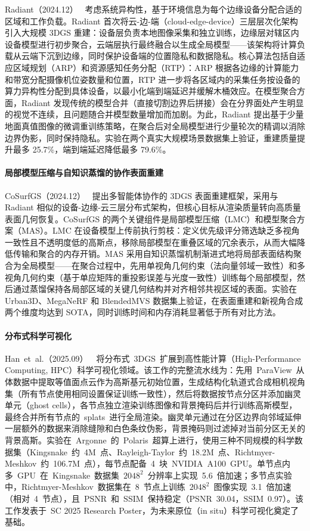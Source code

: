Radiant（2024.12）~\cite{2412_05546} 考虑系统异构性，基于环境信息为每个边缘设备分配合适的区域和工作负载。Radiant 首次将云-边-端（cloud-edge-device）三层层次化架构引入大规模 3DGS 重建：设备层负责本地图像采集和独立训练，边缘层对辖区内设备模型进行初步聚合，云端层执行最终融合以生成全局模型——该架构将计算负载从云端下沉到边缘，同时保护设备端的位置隐私和数据隐私。核心算法包括自适应区域规划（ARP）和资源感知任务分配（RTP）：ARP 根据各边缘的计算能力和带宽分配摄像机位姿数量和位置，RTP 进一步将各区域内的采集任务按设备的算力异构性分配到具体设备，以最小化端到端延迟并缓解木桶效应。在模型聚合方面，Radiant 发现传统的模型合并（直接切割边界后拼接）会在分界面处产生明显的视觉不连续，且问题随合并模型数量增加而加剧。为此，Radiant 提出基于少量地面真值图像的微调重训练策略，在聚合后对全局模型进行少量轮次的精调以消除边界伪影，同时保持隐私。实验在两个真实大规模场景数据集上验证，重建质量提升最多 25.7\%，端到端延迟降低最多 79.6\%。

\paragraph{局部模型压缩与自知识蒸馏的协作表面重建}

CoSurfGS（2024.12）~\cite{2412_17612} 提出多智能体协作的 3DGS 表面重建框架，采用与 Radiant 相似的设备-边缘-云三层分布式架构，但核心目标从渲染质量转向高质量表面几何恢复。CoSurfGS 的两个关键组件是局部模型压缩（LMC）和模型聚合方案（MAS）。LMC 在设备模型上传前执行剪枝：定义优先级评分筛选缺乏多视角一致性且不透明度低的高斯点，移除局部模型在重叠区域的冗余表示，从而大幅降低传输和聚合的内存开销。MAS 采用自知识蒸馏机制渐进式地将局部表面结构聚合为全局模型——在聚合过程中，先用单视角几何约束（法向量邻域一致性）和多视角几何约束（基于单应矩阵的重投影误差与光度一致性）训练每个局部模型，然后通过蒸馏保持各局部区域的关键几何结构并对齐相邻共视区域的表面。实验在 Urban3D、MegaNeRF 和 BlendedMVS 数据集上验证，在表面重建和新视角合成两个维度均达到 SOTA，同时训练时间和内存消耗显著低于所有对比方法。

\paragraph{分布式科学可视化}

Han~et~al.（2025.09）~\cite{2509_12138}~将分布式~3DGS~扩展到高性能计算（High-Performance Computing, HPC）科学可视化领域。该工作的完整流水线为：先用~ParaView~从体数据中提取等值面点云作为高斯基元初始位置，生成结构化轨道式合成相机视角集（所有节点使用相同设置保证训练一致性），然后将数据按节点分区并添加幽灵单元（ghost cells），各节点独立渲染训练图像和背景掩码后并行训练高斯模型，最终合并所有节点的~splats~进行全局渲染。幽灵单元通过在分区边界向邻域延伸一层额外的数据来消除缝隙和白色条纹伪影，背景掩码则过滤掉对当前分区无关的背景高斯。实验在~Argonne~的~Polaris~超算上进行，使用三种不同规模的科学数据集（Kingsnake~约~4M~点、Rayleigh-Taylor~约~18.2M~点、Richtmyer-Meshkov~约~106.7M~点），每节点配备~4~块~NVIDIA~A100~GPU。单节点内多~GPU~在~Kingsnake~数据集~$2048^2$~分辨率上实现~5.6~倍加速；多节点实验中，Richtmyer-Meshkov~数据集在~8~节点上训练~$2048^2$~图像实现~3.1~倍加速（相对~4~节点），且~PSNR~和~SSIM~保持稳定（PSNR~30.04，SSIM~0.97）。该工作发表于~SC 2025 Research Poster，为未来原位（in situ）科学可视化奠定了基础。

